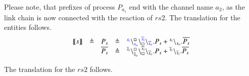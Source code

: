 \begin{example}
\noindent
Please note, that prefixes of process $P_{a_1}$ end with the channel name $a_2$, as the link chain is now connected with the  reaction of  $rs2$.
The translation for the entities follows.
\[
\begin{array}{lclcl}
\llbracket s \rrbracket &\defeq &P_{s} &\defeq & \startchain{{\color{blue}s_i}}\chainedlink{{\color{blue}s_o}}{\noact}\chainedlink{\noact}{{\color{blue}\widehat{s}_i}}\chainend{{\color{blue}\widehat{s}_o}}.P_{s} + \startchain{s_i}\chainend{s_o}.\overline{P_{s}}\\
&& \overline{P_{s}}&\defeq &\startchain{\overline{s}_i}\chainedlink{\overline{s}_o}{\noact}\chainedlink{\noact}{\widehat{s}_i}\chainend{\widehat{s}_o}.P_{s}+\startchain{\overline{s}_i}\chainend{\overline{s}_i}.\overline{P_{s}}\\
%

\end{array}
\]


%


\noindent
The translation for the $rs2$ follows.


\end{example}
